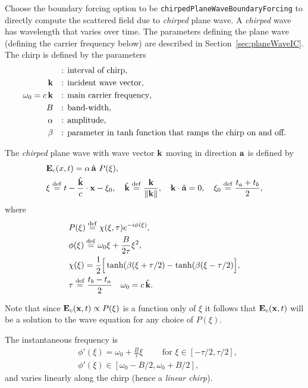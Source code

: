 Choose the boundary forcing option to be {\tt chirpedPlaneWaveBoundaryForcing} to directly compute the 
scattered field due to {\em chirped} plane wave. A {\em chirped} wave has wavelength that
varies over time. The parameters defining the plane wave (defining the carrier frequency below) 
are described in Section~\ref{sec:planeWaveIC}. 
The chirp is defined by the parameters
\begin{align*}
   [t_a,t_b] \quad & \text{: interval of chirp}, \\
   \kv      \quad & \text{: incident wave vector}, \\
   \omega_0 = c \, \kv \quad & \text{: main carrier frequency}, \\
   B         \quad & \text{: band-width}, \\
   \alpha    \quad & \text{: amplitude}, \\
   \beta     \quad & \text{: parameter in $\tanh$ function that ramps the chirp on and off.}
\end{align*}



The {\em chirped} plane wave with wave vector $\mathbf{ k}$ moving in direction $\mathbf{ a}$ is defined by
\begin{align*}
  & \mathbf{ E}_c(x,t) = \alpha \, \hat{\mathbf{ a}}~ P(\xi), \\
  & \xi \overset{{\rm def}}{=} t - \frac{\hat{\mathbf{ k}}}{c}\cdot\mathbf{ x} -\xi_0, \quad
   \hat{\mathbf{ k}} \overset{{\rm def}}{=} \frac{\mathbf{ k}}{\| \mathbf{ k} \|}, \quad \mathbf{ k}\cdot\hat{\mathbf{ a}}=0, \quad
  \xi_0 \overset{{\rm def}}{=} \frac{t_a+t_b}{2}, \\
\end{align*}
where 
\begin{align*}
  & P(\xi) \overset{{\rm def}}{=} \chi(\xi,\tau) e^{-i \phi(\xi) } , \\
  & \phi(\xi) \overset{{\rm def}}{=} \omega_0 \xi +  \frac{B}{2\tau} \xi^2,  \\
  & \chi(\xi) = \frac{1}{2}\Big[ \tanh(\beta(\xi+\tau/2) -\tanh(\beta(\xi-\tau/2) \Big], \\
  & \tau \overset{{\rm def}}{=} \frac{t_b-t_a}{2} \quad \omega_0 = c \, \hat{\mathbf{ k}} .
\end{align*}

Note that since $\mathbf{ E}_c(\mathbf{ x},t) \propto P(\xi)$ is a function only of $\xi$ it follows that $\mathbf{ E}_c(\mathbf{ x},t)$ will be a solution to
the wave equation for any choice of $P(\xi)$.

The instantaneous frequency is
\begin{align*}
&  \phi'(\xi) = \omega_0 + \frac{B}{\tau} \xi \qquad \text{ for $\xi\in[-\tau/2,\tau/2]$}, \\
&  \phi'(\xi) \in [\omega_0 - B/2, \omega_0 + B/2], 
\end{align*}
and varies linearly along the chirp (hence a {\em linear chirp}). 


